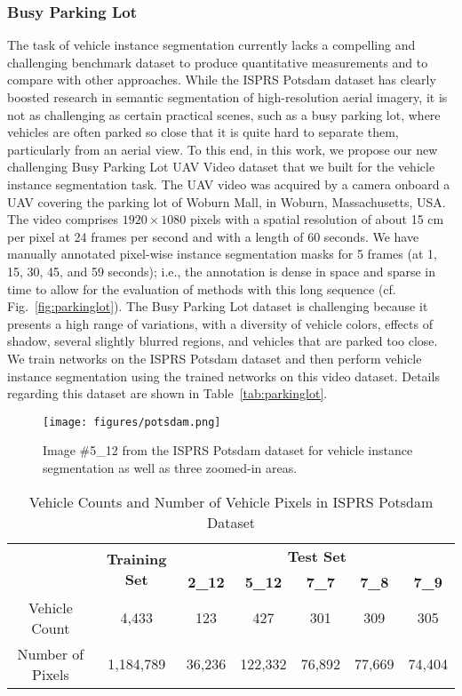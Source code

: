 \documentclass[journal]{IEEEtran}
\begin{document}
\subsubsection{\textbf{Busy Parking Lot}}
The task of vehicle instance segmentation currently lacks a compelling and challenging benchmark dataset to produce quantitative measurements and to compare with other approaches. While the ISPRS Potsdam dataset has clearly boosted research in semantic segmentation of high-resolution aerial imagery, it is not as challenging as certain practical scenes, such as a busy parking lot, where vehicles are often parked so close that it is quite hard to separate them, particularly from an aerial view. To this end, in this work, we propose our new challenging Busy Parking Lot UAV Video dataset that we built for the vehicle instance segmentation task.
The UAV video was acquired by a camera onboard a UAV covering the parking lot of Woburn Mall, in Woburn, Massachusetts, USA. The video comprises $1920\times1080$ pixels with a spatial resolution of about 15 cm per pixel at 24 frames per second and with a length of 60 seconds. We have manually annotated pixel-wise instance segmentation masks for 5 frames (at 1, 15, 30, 45, and 59 seconds); i.e., the annotation is dense in space and sparse in time to allow for the evaluation of methods with this long sequence (cf. Fig.~\ref{fig:parkinglot}). The Busy Parking Lot dataset is challenging because it presents a high range of variations, with a diversity of vehicle colors, effects of shadow, several slightly blurred regions, and vehicles that are parked too close. We train networks on the ISPRS Potsdam dataset and then perform vehicle instance segmentation using the trained networks on this video dataset. Details regarding this dataset are shown in Table~\ref{tab:parkinglot}.

\begin{figure}[t]
\centering
\texttt{[image: figures/potsdam.png]}
\renewcommand{\figurename}{Fig}
\caption{\label{fig:potsdam} Image \#5\_12 from the ISPRS Potsdam dataset for vehicle instance segmentation as well as three zoomed-in areas.}
\end{figure}

\begin{table*}[t]
\caption{\label{tab:potsdam} Vehicle Counts and Number of Vehicle Pixels in ISPRS Potsdam Dataset}
\centering
\begin{tabular}{ccccccc}
\toprule
 & \multirow{2}{*}{\textbf{Training Set}} & \multicolumn{5}{c}{\textbf{Test Set}} \\
\cline{3-7}
 & & \textbf{2\_12} & \textbf{5\_12} & \textbf{7\_7} & \textbf{7\_8} & \textbf{7\_9} \\
\hline
Vehicle Count & 4,433 & 123 & 427 & 301 & 309 & 305 \\
Number of Pixels & 1,184,789 & 36,236 & 122,332 & 76,892 & 77,669 & 74,404 \\
\bottomrule
\end{tabular}
\end{table*}
\end{document}
